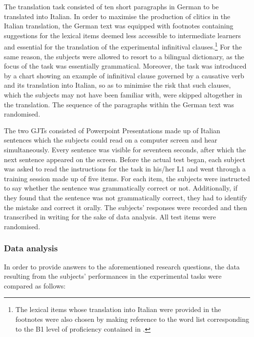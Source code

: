 \documentclass[output=paper,modfonts,nonflat,newtxmath]{langsci/langscibook}
\begin{document}

The translation task consisted of ten short paragraphs in German to be translated into Italian. In order to maximise the production of clitics in the Italian translation, the German text was equipped with footnotes containing suggestions for the lexical items deemed less accessible to intermediate learners and essential for the translation of the experimental infinitival clauses.\footnote{ \textrm{The lexical items whose translation into Italian were provided in the footnotes were also chosen by making reference to the word list corresponding to the B1 level of proficiency contained in \citet{SpinelliParizzi2010}.}} For the same reason, the subjects were allowed to resort to a bilingual dictionary, as the focus of the task was essentially grammatical. Moreover, the task was introduced by a chart showing an example of infinitival clause governed by a causative verb and its translation into Italian, so as to minimise the risk that such clauses, which the subjects may not have been familiar with, were skipped altogether in the translation. The sequence of the paragraphs within the German text was randomised.


The two GJTs consisted of Powerpoint Presentations made up of Italian sentences which the subjects could read on a computer screen and hear simultaneously. Every sentence was visible for seventeen seconds, after which the next sentence appeared on the screen. Before the actual test began, each subject was asked to read the instructions for the task in his/her L1 and went through a training session made up of five items. For each item, the subjects were instructed to say whether the sentence was grammatically correct or not. Additionally, if they found that the sentence was not grammatically correct, they had to identify the mistake and correct it orally. The subjects’ responses were recorded and then transcribed in writing for the sake of data analysis. All test items were randomised.

\subsubsection{Data analysis} %

In order to provide answers to the aforementioned research questions, the data resulting from the subjects’ performances in the experimental tasks were compared as follows:
\end{document}
